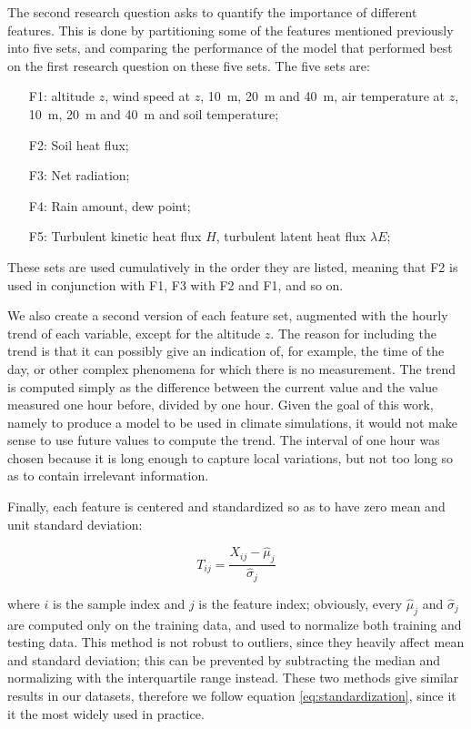 \documentclass[a4paper,11pt]{kth-mag}
\begin{document}
The second research question asks to quantify the importance of different features. This is done by partitioning some of the features mentioned previously into five sets, and comparing the performance of the model that performed best on the first research question on these five sets. The five sets are:

\begin{enumerate}
\item[F1:] altitude $z$, wind speed at $z$, \SI{10}{\meter}, \SI{20}{\meter} and \SI{40}{\meter}, air temperature at $z$, \SI{10}{\meter}, \SI{20}{\meter} and \SI{40}{\meter} and soil temperature;
\item[F2:] Soil heat flux;
\item[F3:] Net radiation;
\item[F4:] Rain amount, dew point;
\item[F5:] Turbulent kinetic heat flux $H$, turbulent latent heat flux $\lambda E$;
\end{enumerate}

These sets are used cumulatively in the order they are listed, meaning that F2 is used in conjunction with F1, F3 with F2 and F1, and so on.

We also create a second version of each feature set, augmented with the hourly trend of each variable, except for the altitude $z$. The reason for including the trend is that it can possibly give an indication of, for example, the time of the day, or other complex phenomena for which there is no measurement. The trend is computed simply as the difference between the current value and the value measured one hour before, divided by one hour. Given the goal of this work, namely to produce a model to be used in climate simulations, it would not make sense to use future values to compute the trend. The interval of one hour was chosen because it is long enough to capture local variations, but not too long so as to contain irrelevant information.

Finally, each feature is centered and standardized so as to have zero mean and unit standard deviation:

\begin{equation}
\label{eq:standardization}
T_{ij}=\frac{X_{ij}-\hat{\mu}_j}{\hat{\sigma}_j}
\end{equation}

\noindent where $i$ is the sample index and $j$ is the feature index; obviously, every $\hat{\mu}_j$ and $\hat{\sigma}_j$ are computed only on the training data, and used to normalize both training and testing data. This method is not robust to outliers, since they heavily affect mean and standard deviation; this can be prevented by subtracting the median and normalizing with the interquartile range instead. These two methods give similar results in our datasets, therefore we follow equation \ref{eq:standardization}, since it it the most widely used in practice.
\end{document}
